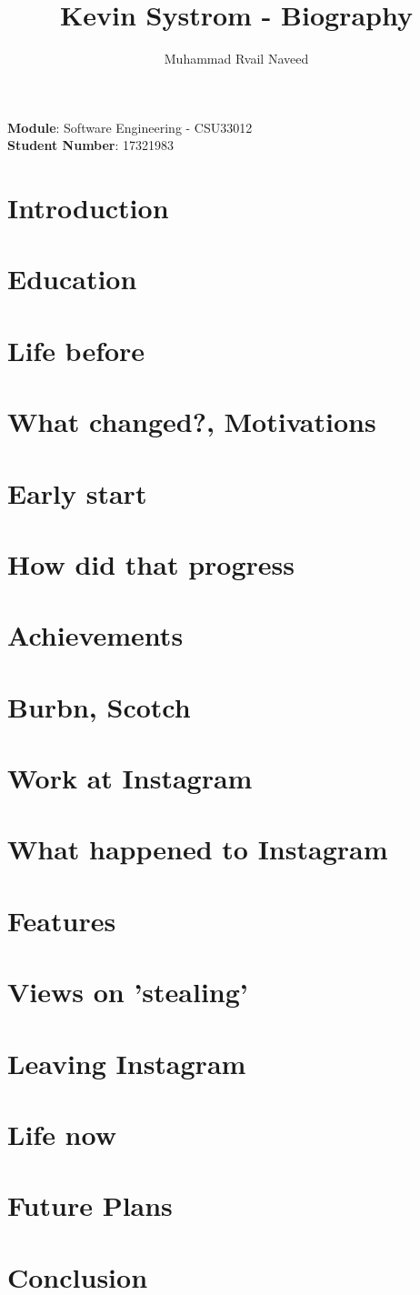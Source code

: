 \documentclass{article}
\title{\textbf{Kevin  Systrom -  Biography}}
\author{Muhammad Rvail Naveed}
\date{}
\begin{document}
    \maketitle

    \begin{center}
        \textbf{Module}: Software Engineering - CSU33012 \\
        \textbf{Student Number}: 17321983 
    \end{center}

    \newpage

    \section{Introduction}
    \section{Education}
    \section{Life before}
    \section{What changed?, Motivations}
    \section{Early start}
    \section{How did that progress}
    \section{Achievements}
    \section{Burbn, Scotch}
    \section{Work at Instagram}
    \section{What happened to Instagram}
    \section{Features}
    \section{Views on 'stealing'}
    \section{Leaving Instagram}
    \section{Life now}
    \section{Future Plans}

    \section{Conclusion}
\end{document}
